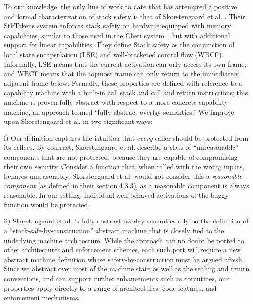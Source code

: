 \documentclass[10pt,conference]{ieeetran}%
\theoremstyle{definition}
\begin{document}
{
%
To our knowledge, the only line of work to date that has attempted
a positive and formal characterization of stack safety
is that of Skorstengaard et al. \cite{SkorstengaardSTKJFP}. Their
StkTokens system enforces stack safety on hardware equipped with
memory capabilities, similar to those used in the Cheri system~\cite{Woodruff+14,Chisnall+15}, but
with additional support for linear capabilities.
They define Stack safety as the conjunction of local state encapsulation (LSE) and
well-bracketed control flow (WBCF).
Informally, LSE means that the current activation can only access its own frame,
and WBCF means that the topmost frame can only return to
the immediately adjacent frame below. Formally, these properties are defined
with reference to a capability machine with a built-in call stack and call and return
instructions; this machine is proven fully abstract with respect to a more
concrete capability machine, an approach termed ``fully abstract overlay semantics.''
We improve upon Skorstengaard et al. \cite{SkorstengaardSTKJFP} in two significant ways:

i) Our definition captures the intuition that {\em
  every} caller should be protected from its callees.  By contrast,
  Skorstengaard et al. \cite{SkorstengaardSTKJFP} describe a class of ``unreasonable'' components
  that are not protected, because they are capable of compromising
  their own security. Consider a function that, when called with the wrong
  inputs, behaves unreasonably. Skorstengaard et al. \cite{SkorstengaardSTKJFP} would not consider this a
  {\em reasonable component} (as defined in their section 4.3.3), as a reasonable
  component is always reasonable. In our setting, individual
  well-behaved activations of the buggy function would be protected.

ii) Skorstengaard et al. \cite{SkorstengaardSTKJFP}'s fully
  abstract overlay semantics rely on the definition of a ``stack-safe-by-construction''
  abstract machine that is closely tied to the underlying machine architecture.
  While the approach can no doubt be ported to other architectures and enforcement
  schemes, each such port will require a new abstract machine definition whose
  safety-by-construction must be argued afresh.
  Since we abstract over most of the machine state as well as the sealing and return conventions, and
  can support further enhancements such as coroutines,
  our properties apply directly to a range of architectures, code features, and enforcement mechanisms.

}
\end{document}
